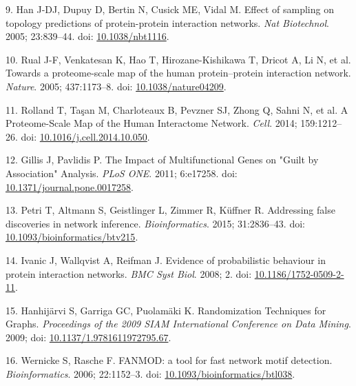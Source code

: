 \begin{CSLReferences}{0}{0}
\leavevmode{}%
9. Han J-DJ, Dupuy D, Bertin N, Cusick ME, Vidal M. Effect of sampling on topology predictions of protein-protein interaction networks. \emph{Nat Biotechnol}. 2005; 23:839--44. doi: \href{https://doi.org/10.1038/nbt1116}{10.1038/nbt1116}.

\leavevmode{}%
10. Rual J-F, Venkatesan K, Hao T, Hirozane-Kishikawa T, Dricot A, Li N, et al. Towards a proteome-scale map of the human protein--protein interaction network. \emph{Nature}. 2005; 437:1173--8. doi: \href{https://doi.org/10.1038/nature04209}{10.1038/nature04209}.

\leavevmode{}%
11. Rolland T, Taşan M, Charloteaux B, Pevzner SJ, Zhong Q, Sahni N, et al. A Proteome-Scale Map of the Human Interactome Network. \emph{Cell}. 2014; 159:1212--26. doi: \href{https://doi.org/10.1016/j.cell.2014.10.050}{10.1016/j.cell.2014.10.050}.

\leavevmode{}%
12. Gillis J, Pavlidis P. The Impact of Multifunctional Genes on "Guilt by Association" Analysis. \emph{PLoS ONE}. 2011; 6:e17258. doi: \href{https://doi.org/10.1371/journal.pone.0017258}{10.1371/journal.pone.0017258}.

\leavevmode{}%
13. Petri T, Altmann S, Geistlinger L, Zimmer R, Küffner R. Addressing false discoveries in network inference. \emph{Bioinformatics}. 2015; 31:2836--43. doi: \href{https://doi.org/10.1093/bioinformatics/btv215}{10.1093/bioinformatics/btv215}.

\leavevmode{}%
14. Ivanic J, Wallqvist A, Reifman J. Evidence of probabilistic behaviour in protein interaction networks. \emph{BMC Syst Biol}. 2008; 2. doi: \href{https://doi.org/10.1186/1752-0509-2-11}{10.1186/1752-0509-2-11}.

\leavevmode{}%
15. Hanhijärvi S, Garriga GC, Puolamäki K. Randomization Techniques for Graphs. \emph{Proceedings of the 2009 SIAM International Conference on Data Mining}. 2009; doi: \href{https://doi.org/10.1137/1.9781611972795.67}{10.1137/1.9781611972795.67}.

\leavevmode{}%
16. Wernicke S, Rasche F. FANMOD: a tool for fast network motif detection. \emph{Bioinformatics}. 2006; 22:1152--3. doi: \href{https://doi.org/10.1093/bioinformatics/btl038}{10.1093/bioinformatics/btl038}.


\end{CSLReferences}
